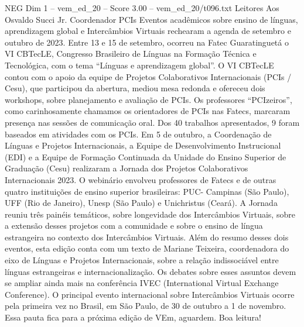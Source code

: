 \begin{textsample}{NEG Dim 1 – vem\_ed\_20 – Score 3.00 – vem\_ed\_20/t096.txt}  \label{ex:f1_neg_073}
Leitores Aos Osvaldo Succi Jr.
Coordenador PCIs Eventos acadêmicos sobre ensino de línguas, aprendizagem global e Intercâmbios Virtuais rechearam a agenda de setembro e outubro de 2023.
Entre 13 e 15 de setembro, ocorreu na Fatec Guaratinguetá o VI CBTecLE, Congresso Brasileiro de Línguas na Formação Técnica e Tecnológica, com o tema “Línguas e aprendizagem global”.
O VI CBTecLE contou com o apoio da equipe de Projetos Colaborativos Internacionais (PCIs / Cesu), que participou da abertura, mediou mesa redonda e ofereceu dois workshops, sobre planejamento e avaliação de PCIs.
Os professores “PCIzeiros”, como carinhosamente chamamos os orientadores de PCIs nas Fatecs, marcaram presença nas sessões de comunicação oral.
Dos 40 trabalhos apresentados, 9 foram baseados em atividades com os PCIs.
Em 5 de outubro, a Coordenação de Línguas e Projetos Internacionais, a Equipe de Desenvolvimento Instrucional (EDI) e a Equipe de Formação Continuada da Unidade do Ensino Superior de Graduação (Cesu) realizaram a Jornada dos Projetos Colaborativos Internacionais 2023.
O webinário envolveu professores de Fatecs e de outras quatro instituições de ensino superior brasileiras: PUC- Campinas (São Paulo), UFF (Rio de Janeiro), Unesp (São Paulo) e Unichristus (Ceará).
A Jornada reuniu três painéis temáticos, sobre longevidade dos Intercâmbios Virtuais, sobre a extensão desses projetos com a comunidade e sobre o ensino de língua estrangeira no contexto dos Intercâmbios Virtuais.
Além do resumo desses dois eventos, esta edição conta com um texto de Mariane Teixeira, coordenadora do eixo de Línguas e Projetos Internacionais, sobre a relação indissociável entre línguas estrangeiras e internacionalização.
Os debates sobre esses assuntos devem se ampliar ainda mais na conferência IVEC (International Virtual Exchange Conference).
O principal evento internacional sobre Intercâmbios Virtuais ocorre pela primeira vez no Brasil, em São Paulo, de 30 de outubro a 1 de novembro.
Essa pauta fica para a próxima edição de VEm, aguardem.
Boa leitura!

\end{textsample}
